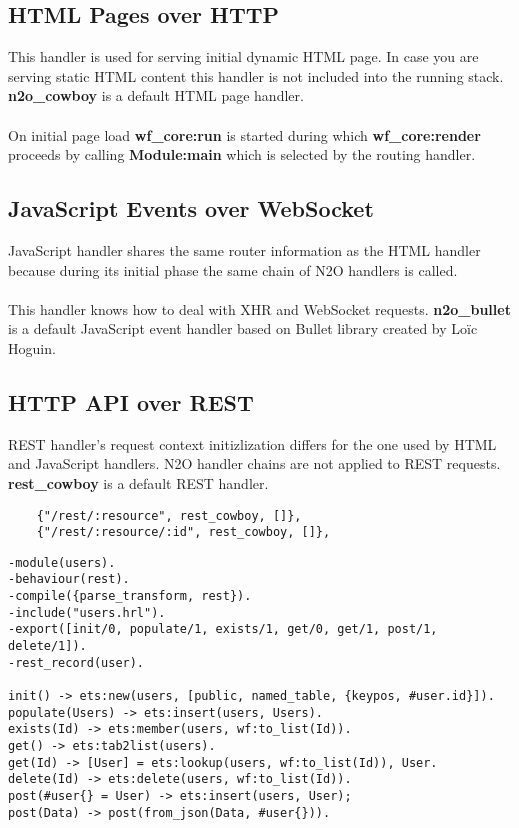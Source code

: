\subsection{HTML Pages over HTTP}
This handler is used for serving initial dynamic HTML page.
In case you are serving static HTML content this handler is
not included into the running stack. {\bf {n2o}\_{cowboy}} is
a default HTML page handler.

\paragraph{}
On initial page load {\bf {wf}\_{core}:run} is started during
which {\bf {wf}\_{core}:render} proceeds by calling {\bf Module:main} which
is selected by the routing handler.

\subsection{JavaScript Events over WebSocket}
JavaScript handler shares the same router information as the
HTML handler because during its initial phase the same chain
of N2O handlers is called.

\paragraph{}
This handler knows how to deal with XHR and WebSocket requests.
{\bf {n2o}\_{bullet}} is a default JavaScript event handler
based on Bullet library created by Loïc Hoguin.

\newpage
\subsection{HTTP API over REST}
REST handler's request context initizlization differs for the one
used by HTML and JavaScript handlers. N2O handler chains are not
applied to REST requests. {\bf rest\_cowboy} is a default REST
handler.

\vspace{1\baselineskip}
\begin{lstlisting}
    {"/rest/:resource", rest_cowboy, []},
    {"/rest/:resource/:id", rest_cowboy, []},
\end{lstlisting}

\lstset{captionpos=b}
\vspace{1\baselineskip}
\begin{lstlisting}[caption=users.erl]
-module(users).
-behaviour(rest).
-compile({parse_transform, rest}).
-include("users.hrl").
-export([init/0, populate/1, exists/1, get/0, get/1, post/1, delete/1]).
-rest_record(user).

init() -> ets:new(users, [public, named_table, {keypos, #user.id}]).
populate(Users) -> ets:insert(users, Users).
exists(Id) -> ets:member(users, wf:to_list(Id)).
get() -> ets:tab2list(users).
get(Id) -> [User] = ets:lookup(users, wf:to_list(Id)), User.
delete(Id) -> ets:delete(users, wf:to_list(Id)).
post(#user{} = User) -> ets:insert(users, User);
post(Data) -> post(from_json(Data, #user{})).
\end{lstlisting}
\vspace{1\baselineskip}

